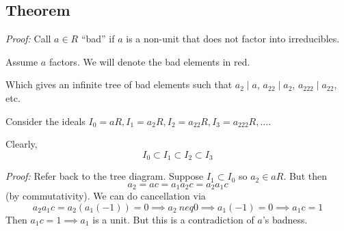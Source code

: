 \documentclass[12pt]{report}
\newenvironment*{tbox}[3][breakable]{
    \begin{tcolorbox}[
        parbox=false,
        colback=#2!5!white,
        colframe=#2!75!black,
        title={#3},
        #1
    ]}
    {\end{tcolorbox}}
\begin{document}
    \subsection*{Theorem}
        \begin{tbox}{gray}{\textbf{Theorem}: If a ring is a PID, it is a UFD}
            \emph{Proof:} Call $a \in R$ ``bad'' if $a$ is a non-unit that does not factor into irreducibles. 

            Assume $a$ factors. We will denote the bad elements in red. 
            \begin{center}
            \end{center}

            Which gives an infinite tree of bad elements such that $a_2 \mid a$, $a_{22} \mid a_2$, $a_{222} \mid a_{22}$, etc. 

            Consider the ideals $I_0 = aR, I_1= a_2R, I_2 = a_{22}R, I_3 = a_{222}R, \dots$.
            
            Clearly, 
            \[I_0 \subset I_1 \subset I_2 \subset I_3\]

            \tcbbreak
            \begin{tcolorbox}[colback=gray!5!white,colframe=gray!75!black,
                title= \emph{Lemma:} $I_k \neq I_{k + 1}$]
                
                \emph{Proof:} Refer back to the tree diagram. Suppose $I_1 \subset I_0$ so $a_2 \in aR$. But then 
                \[a_2 = ac = a_1 a_2c = a_2 a_1 c\] 
                (by commutativity). We can do cancellation via 
                \[a_2a_1c = a_2(a_1(-1)) = 0 \implies a_2\ neq 0 \implies a_1(-1) = 0 \implies a_1c = 1\]
                Then $a_1c = 1 \implies a_1$ is a unit. But this is a contradiction of $a$'s badness. 
            \end{tcolorbox}


\end{tbox}
\end{document}
